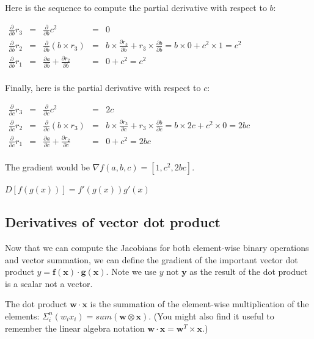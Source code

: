 \documentclass[11pt]{article}
\begin{document}
Here is the sequence to compute the partial derivative with respect to $b$:

$
\begin{array}{lllll}
\frac{\partial }{\partial b} r_3 & = & \frac{\partial }{\partial b} c^2 & = & 0\\
\frac{\partial }{\partial b} r_2 & = & \frac{\partial }{\partial b} (b \times r_3) & = & b \times \frac{\partial r_3}{\partial b} + r_3 \times \frac{\partial b}{\partial b} = b \times 0 + c^2 \times 1 = c^2\\
\frac{\partial }{\partial b} r_1 & = & \frac{\partial a}{\partial b} + \frac{\partial r_2}{\partial b} & = & 0 + c^2 = c^2\\
\end{array}
$

Finally, here is the partial derivative with respect to $c$:
 
$
\begin{array}{lllll}
\frac{\partial }{\partial c} r_3 & = & \frac{\partial }{\partial c} c^2 & = & 2c\\
\frac{\partial }{\partial c} r_2 & = & \frac{\partial }{\partial c} (b \times r_3) & = & b \times \frac{\partial r_3}{\partial c} + r_3 \times \frac{\partial b}{\partial c} = b \times 2c + c^2 \times 0 = 2bc\\
\frac{\partial }{\partial c} r_1 & = & \frac{\partial a}{\partial c} + \frac{\partial r_2}{\partial c} & = & 0 + c^2 = 2bc\\
\end{array}
$

The gradient would be $\nabla f(a,b,c) = [1, c^2, 2bc]$.

$D[f(g(x))] = f'(g(x))g'(x)$

\subsection{Derivatives of vector dot product}

Now that we can compute the Jacobians for both element-wise binary operations and vector summation, we can define the gradient of the important vector dot product $y = \mathbf{f(x)} \cdot \mathbf{g(x)}$. Note we use $y$ not $\mathbf{y}$ as the result of the dot product is a scalar not a vector.

The dot product $\mathbf{w} \cdot \mathbf{x}$ is the summation of the element-wise multiplication of the elements: $\Sigma_i^n (w_i x_i) = sum(\mathbf{w} \otimes \mathbf{x})$. (You might also find it useful to remember the linear algebra notation $\mathbf{w} \cdot \mathbf{x} = \mathbf{w}^{T} \times \mathbf{x}$.)
\end{document}
